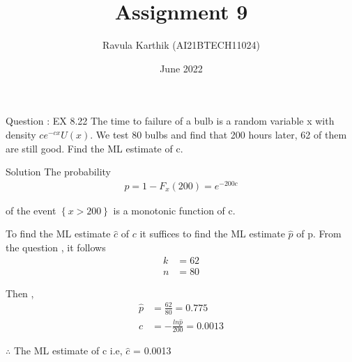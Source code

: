 \documentclass[journal,12pt,twocolumn]{beamer}
\title{Assignment 9}
\author{Ravula Karthik (AI21BTECH11024)}
\date {June 2022}
\providecommand{\cbrak}[1]{\ensuremath{\left\{#1\right\}}}
\begin{document}
	\begin{frame}
		\titlepage 
	\end{frame}
	
	\begin{frame}{Question : EX 8.22}
		The time to failure of a bulb is a random variable x with density $ ce^{-cx} U(x)$. We test 80 bulbs
		and find that 200 hours later, 62 of them are still good. Find the ML estimate of c. 
	\end{frame}
	\begin{frame}{Solution}
		The probability
		\begin{align}
			p = 1 - F_x(200) = e^{-200c}      \nonumber
		\end{align} 
		
		of the event $\cbrak{x > 200}$ is a monotonic function of c.
	\end{frame}
	
	\begin{frame}
		To find the ML estimate $\hat{c}$ of $c$ it suffices to find the ML estimate $\hat{p}$ of p. From the question , it follows 
		\begin{align}
			k &= 62            \nonumber \\
			n &= 80             \nonumber
		\end{align} 
	\end{frame}

	\begin{frame}
Then ,
\begin{align}
	\hat{p} &= \frac{62}{80} = 0.775 \\ 
	\hat{c} &= -\frac{ln\hat{p}}{200} = 0.0013
\end{align} 

$\therefore$ The ML estimate of c i.e, $\hat{c}$ = 0.0013

	\end{frame}
	
	
\end{document}
